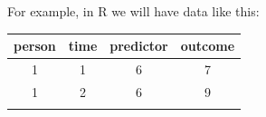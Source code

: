\documentclass[]{article}
\newenvironment{Shaded}{\begin{snugshade}}{\end{snugshade}}
\newcommand{\StringTok}[1]{\textcolor[rgb]{0.31,0.60,0.02}{#1}}
\newcommand{\OperatorTok}[1]{\textcolor[rgb]{0.81,0.36,0.00}{\textbf{#1}}}
\newcommand{\NormalTok}[1]{#1}
\theoremstyle{definition}
\theoremstyle{definition}
\theoremstyle{definition}
\theoremstyle{remark}
\begin{document}
For example, in R we will have data like this:

\begin{Shaded}
\end{Shaded}

\begin{longtable}[]{@{}cccc@{}}
\toprule
\begin{minipage}[b]{0.11\columnwidth}\centering\strut
person\strut
\end{minipage} & \begin{minipage}[b]{0.09\columnwidth}\centering\strut
time\strut
\end{minipage} & \begin{minipage}[b]{0.15\columnwidth}\centering\strut
predictor\strut
\end{minipage} & \begin{minipage}[b]{0.11\columnwidth}\centering\strut
outcome\strut
\end{minipage}\tabularnewline
\midrule
\endhead
\begin{minipage}[t]{0.11\columnwidth}\centering\strut
1\strut
\end{minipage} & \begin{minipage}[t]{0.09\columnwidth}\centering\strut
1\strut
\end{minipage} & \begin{minipage}[t]{0.15\columnwidth}\centering\strut
6\strut
\end{minipage} & \begin{minipage}[t]{0.11\columnwidth}\centering\strut
7\strut
\end{minipage}\tabularnewline
\begin{minipage}[t]{0.11\columnwidth}\centering\strut
1\strut
\end{minipage} & \begin{minipage}[t]{0.09\columnwidth}\centering\strut
2\strut
\end{minipage} & \begin{minipage}[t]{0.15\columnwidth}\centering\strut
6\strut
\end{minipage} & \begin{minipage}[t]{0.11\columnwidth}\centering\strut
9\strut
\end{minipage}\tabularnewline
\begin{minipage}[t]{0.11\columnwidth}\centering\strut

\end{minipage}
\end{longtable}
\end{document}
